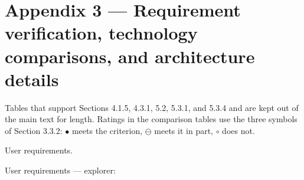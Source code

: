 \newpage
\section*{Appendix 3 --- Requirement verification, technology comparisons, and architecture details}

Tables that support Sections 4.1.5, 4.3.1, 5.2, 5.3.1, and 5.3.4 and are kept out of the main text for length. Ratings in the comparison tables use the three symbols of Section 3.3.2: $\bullet$ meets the criterion, $\ominus$ meets it in part, $\circ$ does not.

User requirements.

User requirements --- explorer:

